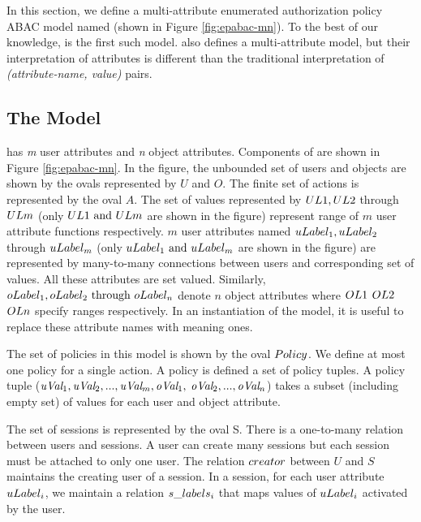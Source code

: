 	In this section, we define a multi-attribute enumerated authorization policy ABAC model named \EPMNModel{} (shown in Figure \ref{fig:epabac-mn}). To the best of our knowledge, \EPMNModel{} is the first such model. \PM{}\cite{policy-machine} also defines a multi-attribute \EPModels{} model, but their interpretation of attributes is different than the traditional interpretation of \textit{(attribute-name, value)} pairs.
	
	\subsection{The \EPMNModel{} Model }
	\label{sec:epmodels}
	\label{sec:epmodel}	
	
	
	
	
	\EPMNModel{} has \textit{m} user attributes and \textit{n} object attributes. Components of \EPMNModel{}  are shown in Figure \ref{fig:epabac-mn}.  In the figure, the unbounded set of users and objects are shown by the ovals represented by $U$ and $O$. The finite set of actions is represented by the oval $A$. The set of values represented by $UL{1}, UL{2}$ through $UL{m}$ (only $UL{1} \text{ and } UL{m}$ are shown in the figure) represent range of $m$ user attribute functions respectively.  $m$ user attributes named $uLabel_{1}, uLabel_{2}$ through $uLabel_{m}$ (only $uLabel_{1} \text{ and } uLabel_{m}$ are shown in the figure) are represented by many-to-many connections between users and  corresponding set of values. All these attributes are set valued. Similarly, $oLabel_{1}, oLabel_{2} \text{ through } oLabel_{n}$ denote $n$ object attributes where $OL{1}$ $OL{2}$  $OL{n}$ specify ranges respectively. In an instantiation of the model, it is useful to replace these  attribute names with meaning ones.
	
		
	
	
	The set of policies in this model is shown by the oval $Policy$. We define at most one policy for a single action. A policy is defined a set of policy tuples. A policy tuple  ($\textit{uVal}_{1},\textit{uVal}_{2}, ..., \textit{uVal}_{m}, \textit{oVal}_{1},$ $\textit{oVal}_{2}, ..., \textit{oVal}_{n}$) takes a subset (including empty set) of values for each user and object attribute.
	
	
	
	
	The set of sessions is represented by the oval S. There is a one-to-many relation between users and sessions. A user can create many sessions but each session must be attached to only one user. The relation $creator$ between $U$ and $S$ maintains the creating user of a session. In a session, for each user attribute $uLabel_{i}$, we maintain a relation $s\_labels_{i}$ that maps values of $uLabel_{i}$ activated by the user. 
	
